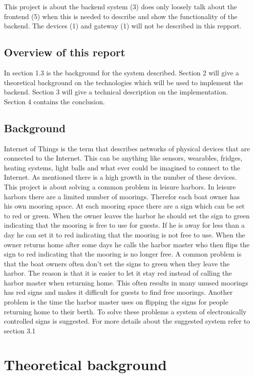 \documentclass[a4paper,12pt,english]{article}
\begin{document}
This project is about the backend system (3) does only
loosely talk about the frontend (5) when this is needed to describe and show the
functionality of the backend. The devices (1) and gateway (1) will not be
described in this repport. 

\subsection{Overview of this report}
In section 1.3 is the background for the system described. Section 2 will give a
theoretical background on the technologies which will be used
to implement the backend. Section 3 will give a technical description on the
implementation. Section 4 contains the conclusion.

\subsection{Background}
Internet of Things is the term that describes networks of physical devices that
are connected to the Internet. This can be anything like sensors, wearables,
fridges, heating systems, light balls and what ever could be imagined to
connect to the Internet.
As mentioned there is a high growth in the number of these devices. This project
is about solving a common problem in leisure harbors. 
In leisure harbors there are a limited number of moorings. Therefor each boat
owner has his own mooring space. At each mooring space there are a sign which
can be set to red or green. When the owner leaves the harbor he should set the
sign to green indicating that the mooring is free to use for guests. If he is
away for less than a day he can set it to red indicating that the mooring is
not free to use. When the owner returns home after some days he calls the harbor
master who then flips the sign to red indicating that the mooring is no longer
free. A common problem is that the boat owners often don’t set the signs to
green when they leave the harbor. The reason is that it is easier to let it stay
red instead of calling the harbor master when returning home. This often results
in many unused moorings has red signs and makes it difficult for guests to find
free moorings. Another problem is the time the harbor master uses on flipping
the signs for people returning home to their berth.
To solve these problems a system of electronically controlled signs is
suggested. For more details about the suggested system refer to section 3.1


\section{Theoretical background}
\end{document}
